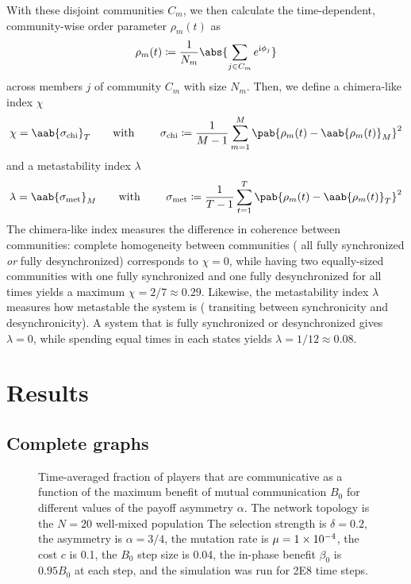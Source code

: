\documentclass[pdflatex,lineno,referee,sn-mathphys-ay]{sn-jnl}
\begin{document}
With these disjoint communities $C_m$, we then calculate
the time-dependent, community-wise order parameter $\rho_m(t)$
as
\begin{equation}
  \rho_m(t) \coloneqq \frac{1}{N_m} \abs{\sum_{j \in C_m} e^{\im \phi_j}}
\end{equation}
across members $j$ of community $C_m$ with size $N_m$.
Then, we define a chimera-like index $\chi$
\begin{equation}
  \chi = \aab{
    \sigma_{\text{chi}}}_T
    \text{\qquad with \qquad}
    \sigma_{\text{chi}} \coloneqq \frac{1}{M-1} \sum_{m=1}^M
    \pab{\rho_m(t) - \aab{\rho_m(t)}_M}^2
  \label{eq:chimera_index}
\end{equation}
and a metastability index $\lambda$
\begin{equation}
  \lambda = \aab{
    \sigma_{\text{met}}}_M
    \text{\qquad with \qquad}
    \sigma_{\text{met}} \coloneqq \frac{1}{T-1} \sum_{t=1}^T
    \pab{\rho_m(t) - \aab{\rho_m(t)}_T}^2
  \label{eq:metastability_index}
\end{equation}
The chimera-like index measures the difference in coherence between communities:
complete homogeneity between communities
(\eg{} all fully synchronized \emph{or} fully desynchronized)
corresponds to $\chi = 0$,
while having two equally-sized communities
with one fully synchronized and one fully desynchronized
for all times yields a maximum $\chi = 2/7 \approx \num{0.29}$.
Likewise, the metastability index $\lambda$ measures how metastable
the system is (\ie{} transiting between synchronicity and desynchronicity).
A system that is fully synchronized or desynchronized gives $\lambda = 0$,
while spending equal times in each states yields $\lambda = 1/12 \approx \num{0.08}$.

\section{Results}
\label{sec:results}
\subsection{Complete graphs}
\label{sec:complete_graph}

\begin{figure}
  \centering
  
  \caption{
    Time-averaged fraction of players that are communicative as a function
    of the maximum benefit of mutual communication $B_0$
    for different values of the payoff asymmetry $\alpha$.
    The network topology is the
    $N=20$ well-mixed population
    The selection strength is $\delta=0.2$,
    the asymmetry is $\alpha=3/4$,
    the mutation rate is $\mu=\num{1E-4}$,
    the cost $c$ is \num{0.1},
    the $B_0$ step size is \num{0.04},
    the in-phase benefit $\beta_0$ is $\num{0.95} B_0$ at each step,
    and the simulation was run for \num{2E8} time steps.
  }
  \label{fig:graph_multi-comm-frac}
\end{figure}
\end{document}
